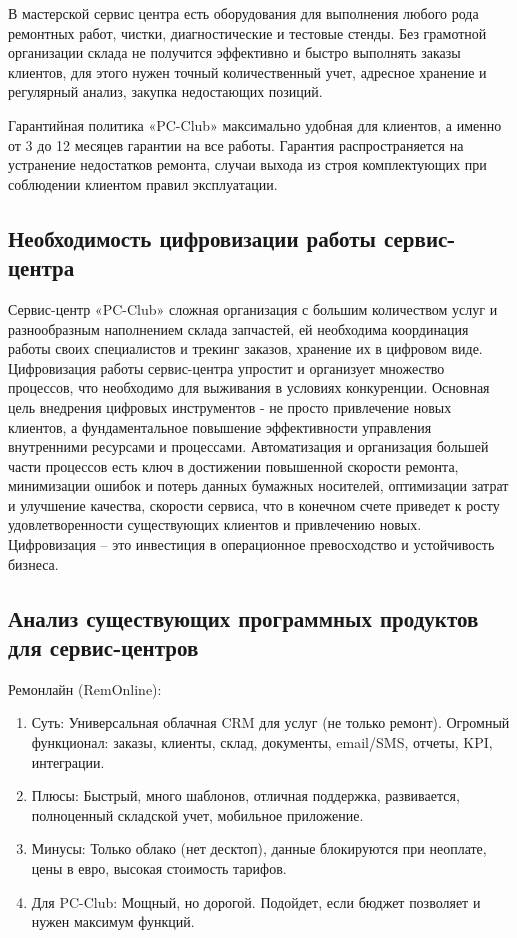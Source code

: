 В мастерской сервис центра есть оборудования для выполнения любого рода ремонтных работ, чистки, диагностические и тестовые стенды. Без грамотной организации склада не получится эффективно и быстро выполнять заказы клиентов, для этого нужен точный количественный учет, адресное хранение и регулярный анализ, закупка недостающих позиций.

Гарантийная политика «PC-Club» максимально удобная для клиентов, а именно от 3 до 12 месяцев гарантии на все работы. Гарантия распространяется на устранение недостатков ремонта, случаи выхода из строя комплектующих при соблюдении клиентом правил эксплуатации.

\subsection{Необходимость цифровизации работы сервис-центра}

Сервис-центр «PC-Club» сложная организация с большим количеством услуг и разнообразным наполнением склада запчастей, ей необходима координация работы своих специалистов и трекинг заказов, хранение их в цифровом виде. Цифровизация работы сервис-центра упростит и организует множество процессов, что необходимо для выживания в условиях конкуренции. Основная цель внедрения цифровых инструментов - не просто привлечение новых клиентов, а фундаментальное повышение эффективности управления внутренними ресурсами и процессами. Автоматизация и организация большей части процессов есть ключ в достижении повышенной скорости ремонта, минимизации ошибок и потерь данных бумажных носителей, оптимизации затрат и улучшение качества, скорости сервиса, что в конечном счете приведет к росту удовлетворенности существующих клиентов и привлечению новых. Цифровизация – это инвестиция в операционное превосходство и устойчивость бизнеса.

\subsection{Анализ существующих программных продуктов для сервис-центров}

Ремонлайн (RemOnline):
\begin{enumerate}
	\item Суть: Универсальная облачная CRM для услуг (не только ремонт). Огромный функционал: заказы, клиенты, склад, документы, email/SMS, отчеты, KPI, интеграции.
	\item Плюсы: Быстрый, много шаблонов, отличная поддержка, развивается, полноценный складской учет, мобильное приложение.
	\item Минусы: Только облако (нет десктоп), данные блокируются при неоплате, цены в евро, высокая стоимость тарифов.
	\item Для PC-Club: Мощный, но дорогой. Подойдет, если бюджет позволяет и нужен максимум функций.
\end{enumerate}

